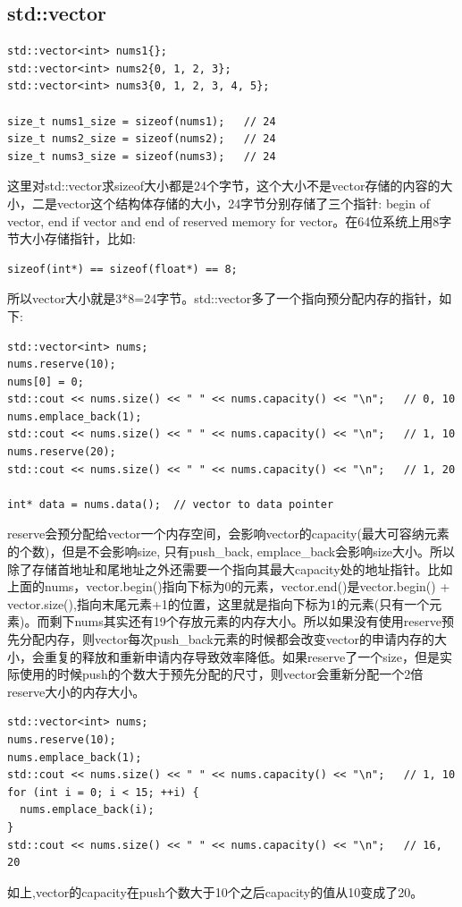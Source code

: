 \documentclass[12pt]{book}
\begin{document}
\subsection{std::vector}
\begin{lstlisting}
std::vector<int> nums1{};
std::vector<int> nums2{0, 1, 2, 3};
std::vector<int> nums3{0, 1, 2, 3, 4, 5};

size_t nums1_size = sizeof(nums1);   // 24
size_t nums2_size = sizeof(nums2);   // 24
size_t nums3_size = sizeof(nums3);   // 24
\end{lstlisting}
这里对std::vector求sizeof大小都是24个字节，这个大小不是vector存储的内容的大小，二是vector这个结构体存储的大小，24字节分别存储了三个指针: begin of vector, end if vector and end of reserved memory for vector。在64位系统上用8字节大小存储指针，比如:
\begin{lstlisting}
sizeof(int*) == sizeof(float*) == 8;
\end{lstlisting}
所以vector大小就是3*8=24字节。std::vector多了一个指向预分配内存的指针，如下:
\begin{lstlisting}
std::vector<int> nums;
nums.reserve(10);
nums[0] = 0;
std::cout << nums.size() << " " << nums.capacity() << "\n";   // 0, 10
nums.emplace_back(1);
std::cout << nums.size() << " " << nums.capacity() << "\n";   // 1, 10
nums.reserve(20);
std::cout << nums.size() << " " << nums.capacity() << "\n";   // 1, 20

int* data = nums.data();  // vector to data pointer
\end{lstlisting}
reserve会预分配给vector一个内存空间，会影响vector的capacity(最大可容纳元素的个数)，但是不会影响size, 只有push\_back, emplace\_back会影响size大小。所以除了存储首地址和尾地址之外还需要一个指向其最大capacity处的地址指针。比如上面的nums，vector.begin()指向下标为0的元素，vector.end()是vector.begin() + vector.size(),指向末尾元素+1的位置，这里就是指向下标为1的元素(只有一个元素)。而剩下nums其实还有19个存放元素的内存大小。所以如果没有使用reserve预先分配内存，则vector每次push\_back元素的时候都会改变vector的申请内存的大小，会重复的释放和重新申请内存导致效率降低。如果reserve了一个size，但是实际使用的时候push的个数大于预先分配的尺寸，则vector会重新分配一个2倍reserve大小的内存大小。
\begin{lstlisting}
std::vector<int> nums;
nums.reserve(10);
nums.emplace_back(1);
std::cout << nums.size() << " " << nums.capacity() << "\n";   // 1, 10
for (int i = 0; i < 15; ++i) {
  nums.emplace_back(i);
}
std::cout << nums.size() << " " << nums.capacity() << "\n";   // 16, 20
\end{lstlisting}
如上,vector的capacity在push个数大于10个之后capacity的值从10变成了20。
\end{document}
